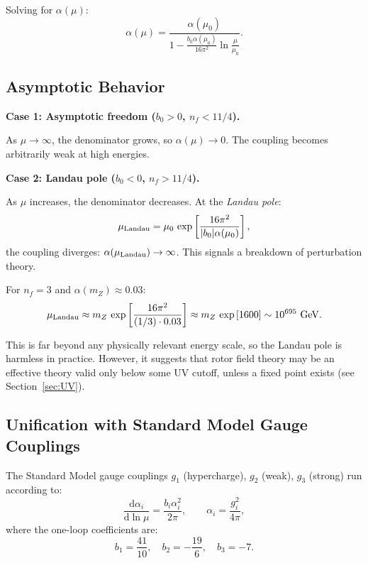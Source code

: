 \documentclass[11pt,a4paper]{article}
\numberwithin{equation}{section}
\theoremstyle{plain}
\theoremstyle{definition}
\theoremstyle{remark}
\newcommand{\dd}{\mathrm{d}}
\begin{document}
Solving for $\alpha(\mu)$:
\begin{equation}
\alpha(\mu) = \frac{\alpha(\mu_0)}{1 - \frac{b_0\alpha(\mu_0)}{16\pi^2}\ln\frac{\mu}{\mu_0}}.
\label{eq:alpha-running}
\end{equation}

\subsection{Asymptotic Behavior}

\textbf{Case 1: Asymptotic freedom ($b_0>0$, $n_f<11/4$).}

As $\mu\to\infty$, the denominator grows, so $\alpha(\mu)\to 0$. The coupling becomes arbitrarily weak at high energies.

\textbf{Case 2: Landau pole ($b_0<0$, $n_f>11/4$).}

As $\mu$ increases, the denominator decreases. At the \emph{Landau pole}:
\begin{equation}
\mu_{\rm Landau} = \mu_0\,\exp\left[\frac{16\pi^2}{|b_0|\alpha(\mu_0)}\right],
\label{eq:mu-Landau}
\end{equation}
the coupling diverges: $\alpha(\mu_{\rm Landau})\to\infty$. This signals a breakdown of perturbation theory.

For $n_f=3$ and $\alpha(m_Z)\approx 0.03$:
\begin{equation}
\mu_{\rm Landau} \approx m_Z\,\exp\left[\frac{16\pi^2}{(1/3)\cdot 0.03}\right] \approx m_Z\,\exp\left[1600\right] \sim 10^{695}\text{ GeV}.
\label{eq:mu-Landau-nf3}
\end{equation}

This is far beyond any physically relevant energy scale, so the Landau pole is harmless in practice. However, it suggests that rotor field theory may be an effective theory valid only below some UV cutoff, unless a fixed point exists (see Section~\ref{sec:UV}).

\subsection{Unification with Standard Model Gauge Couplings}

The Standard Model gauge couplings $g_1$ (hypercharge), $g_2$ (weak), $g_3$ (strong) run according to:
\begin{equation}
\frac{\dd\alpha_i}{\dd\ln\mu} = \frac{b_i\alpha_i^2}{2\pi}, \qquad \alpha_i = \frac{g_i^2}{4\pi},
\label{eq:RG-SM}
\end{equation}
where the one-loop coefficients are:
\begin{equation}
b_1 = \frac{41}{10}, \quad b_2 = -\frac{19}{6}, \quad b_3 = -7.
\label{eq:b-SM}
\end{equation}
\end{document}
